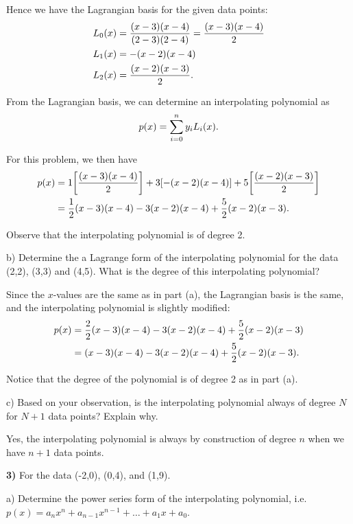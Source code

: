 \documentclass[12pt,a4paper]{article}
\newcommand{\prob}[2]{\textbf{#1)} #2}
\begin{document}
Hence we have the Lagrangian basis for the given data points:
\begin{align*}
    L_0\qty(x) &= \frac{\qty(x-3)\qty(x-4)}{\qty(2-3)\qty(2-4)} = \frac{\qty(x-3)\qty(x-4)}{2} \\
    L_1\qty(x) &= -\qty(x-2)\qty(x-4) \\
    L_2\qty(x) &= \frac{\qty(x-2)\qty(x-3)}{2}
.\end{align*}

From the Lagrangian basis, we can determine an interpolating polynomial as
\begin{align*}
    p\qty(x) = \sum_{i=0}^{n} y_iL_i\qty(x) 
.\end{align*}

For this problem, we then have
\begin{align*}
    p\qty(x) &= 1\qty[\frac{\qty(x-3)\qty(x-4)}{2}] + 3\qty[-\qty(x-2)\qty(x-4)] + 5\qty[\frac{\qty(x-2)\qty(x-3)}{2}]  \\
    &= \frac{1}{2}\qty(x-3)\qty(x-4) - 3\qty(x-2)\qty(x-4)  + \frac{5}{2}\qty(x-2)\qty(x-3) 
.\end{align*}

Observe that the interpolating polynomial is of degree 2.

b) Determine the a Lagrange form of the interpolating polynomial for the data (2,2), (3,3) and (4,5).
What is the degree of this interpolating polynomial?

Since the $x$-values are the same as in part (a), the Lagrangian basis is the same, and the interpolating polynomial is slightly modified:
\begin{align*}
    p\qty(x) &= \frac{2}{2}\qty(x-3)\qty(x-4) - 3\qty(x-2)\qty(x-4)  + \frac{5}{2}\qty(x-2)\qty(x-3) \\
    &= \qty(x-3)\qty(x-4) - 3\qty(x-2)\qty(x-4)  + \frac{5}{2}\qty(x-2)\qty(x-3) 
.\end{align*}

Notice that the degree of the polynomial is of degree 2 as in part (a).

c) Based on your observation, is the interpolating polynomial always of degree $N$ for $N+1$ data points? 
Explain why.

Yes, the interpolating polynomial is always by construction of degree $n$ when we have $n+1$ data points.

\prob{3}{For the data (-2,0), (0,4), and (1,9).}

a) Determine the power series form of the interpolating polynomial, i.e. $p(x) = a_{n}x^{n} + a_{n-1}x^{n-1} + \ldots + a_1x + a_0$.
\end{document}
